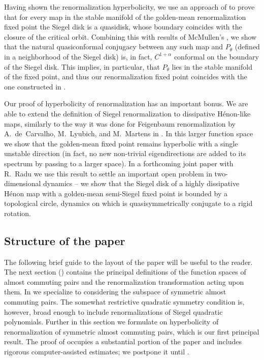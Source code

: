 Having shown the renormalization hyperbolicity, we use an approach of \cite{Ya3} to prove that for every map in the stable manifold of the golden-mean renormalization fixed point the Siegel disk is a quasidisk, whose boundary coincides with the closure of the critical orbit. Combining this with results of McMullen's  \cite{McM}, we show that the natural quasiconformal conjugacy between any such map and $P_\theta$ (defined in a neighborhood of the Siegel disk) is, in fact, $C^{1+\alpha}$ conformal on the boundary of the Siegel disk. This implies, in particular, that $P_\theta$ lies in the stable manifold of the fixed point, and thus our renormalization fixed point coincides with the one constructed in \cite{McM}.

Our proof of hyperbolicity of renormalization has an important bonus. We are able to extend the definition of Siegel renormalization to 
dissipative H\'enon-like maps, similarly to the way it was done for Feigenbaum renormalization by A.~de~Carvalho, M.~Lyubich, and M.~Martens in \cite{CLM}. 
In this larger function space we show that the golden-mean fixed point
remains hyperbolic with a single unstable direction (in fact, no new non-trivial eigendirections are added to its spectrum by passing to a larger space). In a forthcoming joint paper with R.~Radu \cite{GaRYa} we use this result to settle an important open problem in two-dimensional dynamics -- we show that the Siegel disk of a highly dissipative H\'enon map with a golden-mean semi-Siegel fixed point is bounded by a topological circle, dynamics on which is quasisymmetrically conjugate to a rigid rotation.



\subsection*{Structure of the paper}
The following brief guide to the layout of the paper will be useful to the reader. The next section () contains the principal definitions of the function spaces of almost commuting pairs and the renormalization transformation acting upon them. In  we specialize to considering the subspace of symmetric almost commuting pairs. The somewhat restrictive quadratic symmetry condition is, however, broad enough to include renormalizations of Siegel quadratic polynomials. Further in this section we formulate  on hyperbolicity of renormalization of symmetric almost commuting pairs, which is our first principal result. The proof of  occupies a substantial portion of the paper and includes rigorous computer-assisted estimates; we postpone it until  . 

